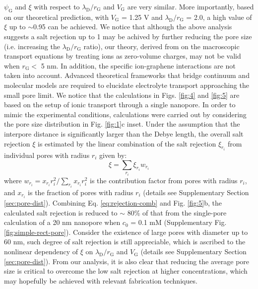 \documentclass[journal=langd5,email=true, hyperref=true, keywords=false]{achemso}
\begin{document}
$\psi_{\mathrm{G}}$ and $\xi$ with respect to
$\lambda_{\mathrm{D}}/r_{\mathrm{G}}$ and $V_{\mathrm{G}}$ are very
similar. More importantly, based on our theoretical prediction, with
$V_{\mathrm{G}}$ = 1.25 V and $\lambda_{\mathrm{D}} / r_{\mathrm{G}}$
= { 2.0},
a high value of $\xi$ up to $\sim$0.95 can be achieved.  We
notice that although the above analysis suggests a salt rejection up
to 1 may be achived by further reducing the pore size (i.e. increasing
the $\lambda_{\mathrm{D}}/r_{\mathrm{G}}$ ratio), our theory, derived
from on the macroscopic transport equations by treating ions as
zero-volume charges, may not be valid when $r_{\mathrm{G}}<$ 5
nm\cite{Jain_2015}. In addition, the specific ion-graphene
interactions \cite{Rollings_2016} are not taken into account. Advanced
theoretical frameworks that bridge continuum and molecular models are
required to elucidate electrolyte transport approaching the small pore
limit. 
{
We notice that the calculations in Figs. \ref{fig:4} and \ref{fig:5} 
are based on the setup  of ionic transport through a single nanopore.
In order to mimic the experimental conditions, 
calculations were carried out by considering the pore size distribution in Fig. \ref{fig:1}c inset. 
Under the assumption that the interpore distance is significantly larger than the Debye length,
the overall salt rejection $\xi$ is
estimated by the linear combination of the salt rejection 
$\xi_{r_i}$ 
from individual pores with radius $r_i$ given by:
\begin{equation}
\label{eq:rejection-comb}
\xi = \sum_{r_{i}} \xi_{r_{i}} w_{r_{i}}
\end{equation}
where
$w_{r_{i}} = x_{r_{i}} r_{i}^{2} / \sum_{r_{i}} x_{r_{i}} r_{i}^{2} $
is the contribution factor from pores with radius $r_{i}$, and
$x_{r_{i}}$ is the fraction of pores with radius $r_{i}$ (details see
Supplementary Section \ref{sec:pore-dist}). Combining
Eq. \ref{eq:rejection-comb} and Fig. \ref{fig:5}b, the calculated salt
rejection is reduced to $\sim{}$ 80\% of that from the single-pore
calculation of a 20 nm nanopore when $c_{0}$ = 0.1 mM (Supplementary
Fig.  \ref{fig:simple-rect-pore}). Consider the existence of large
pores with diameter up to 60 nm, such degree of salt rejection is
still appreciable, which is ascribed to the nonlinear dependency of
$\xi$ on $\lambda_{\mathrm{D}} / r_{\mathrm{G}}$ and $V_{\mathrm{G}}$
(details see Supplementary Section \ref{sec:pore-dist}).}  From our
analysis, it is also clear that reducing the average pore size is critical
to overcome the low salt rejection at higher concentrations, which may
hopefully be achieved with relevant fabrication techniques.
\end{document}

